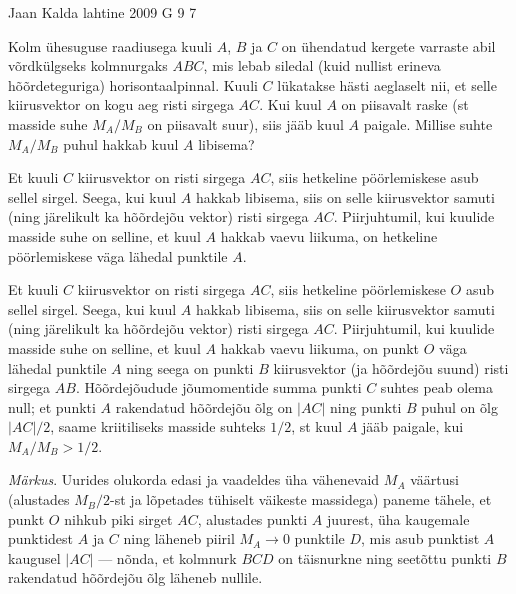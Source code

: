 {Jaan Kalda} %
{lahtine} %
{2009} %
{G 9} %
{7} %
{
\ifStatement
Kolm ühesuguse raadiusega kuuli $A$, $B$ ja $C$ on ühendatud kergete varraste abil võrdkülgseks kolmnurgaks $ABC$, mis lebab siledal (kuid nullist erineva hõõrdeteguriga) horisontaalpinnal. Kuuli $C$ lükatakse hästi aeglaselt nii, et selle kiirusvektor on kogu aeg risti sirgega $AC$. Kui kuul $A$ on piisavalt raske (st masside suhe $M_A/M_B$ on piisavalt suur), siis jääb kuul $A$ paigale. Millise suhte $M_A/M_B$ puhul hakkab kuul $A$ libisema?
\fi


\ifHint
Et kuuli $C$ kiirusvektor on risti sirgega $AC$, siis hetkeline pöörlemiskese asub sellel sirgel. Seega, kui kuul $A$ hakkab libisema, siis on selle kiirusvektor samuti (ning järelikult ka hõõrdejõu vektor) risti sirgega $AC$. Piirjuhtumil, kui kuulide masside suhe on selline, et kuul $A$ hakkab vaevu liikuma, on hetkeline pöörlemiskese väga lähedal punktile $A$.
\fi


\ifSolution
Et kuuli $C$ kiirusvektor on risti sirgega $AC$, siis hetkeline pöörlemiskese $O$ asub sellel sirgel. Seega, kui kuul $A$ hakkab libisema, siis on selle kiirusvektor samuti (ning järelikult ka hõõrdejõu vektor) risti sirgega $AC$. Piirjuhtumil, kui kuulide masside suhe on selline, et kuul $A$ hakkab vaevu liikuma, on punkt $O$ väga lähedal punktile $A$ ning seega on punkti $B$ kiirusvektor (ja hõõrdejõu suund) risti sirgega $AB$. Hõõrdejõudude jõumomentide summa punkti $C$ suhtes peab olema null; et punkti $A$ rakendatud hõõrdejõu õlg on $|AC|$ ning punkti $B$ puhul on õlg $|AC|/2$, saame kriitiliseks masside suhteks $1/2$, st kuul $A$ jääb paigale, kui $M_A/M_B > 1/2$.

\emph{Märkus}. Uurides olukorda edasi ja vaadeldes üha vähenevaid $M_A$ väärtusi (alustades $M_B/2$-st ja lõpetades tühiselt väikeste massidega) paneme tähele, et punkt $O$ nihkub piki sirget $AC$, alustades punkti $A$ juurest, üha kaugemale punktidest $A$ ja $C$ ning läheneb piiril $M_A \rightarrow 0$ punktile $D$, mis asub punktist $A$ kaugusel $|AC|$ --- nõnda, et kolmnurk $BCD$ on täisnurkne ning seetõttu punkti $B$ rakendatud hõõrdejõu õlg läheneb nullile.
\fi
}